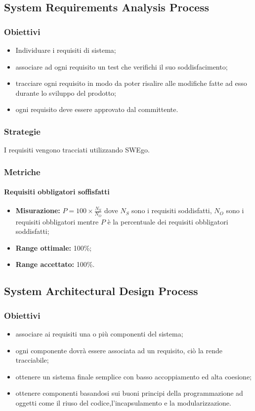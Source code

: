 	\subsection{System Requirements Analysis Process}
\subsubsection{Obiettivi}
\begin{itemize}
	\item Individuare i requisiti di sistema;
	\item associare ad ogni requisito un test che verifichi il suo soddisfacimento; 
	\item tracciare ogni requisito in modo da poter risalire alle modifiche fatte ad esso durante lo sviluppo del prodotto;
	\item ogni requisito deve essere approvato dal committente.
\end{itemize}
\subsubsection{Strategie}
I requisiti vengono tracciati utilizzando SWEgo.
\subsubsection{Metriche}
\paragraph{Requisiti obbligatori soffisfatti}
\begin{itemize}
	\item \textbf{Misurazione:} $P=100\times\frac{N_S}{N_O}$ dove $N_S$ sono i requisiti soddisfatti, $N_O$ sono i requisiti obbligatori mentre $P$ è la percentuale dei requisiti obbligatori soddisfatti;
	\item \textbf{Range ottimale:} 100\%;
	\item \textbf{Range accettato:} 100\%.
\end{itemize}

	\subsection{System Architectural Design Process}
		\subsubsection{Obiettivi}
		\begin{itemize}
			\item associare ai requisiti una o più componenti del sistema;
			\item ogni componente dovrà essere associata ad un requisito, ciò la rende tracciabile;
			\item ottenere un sistema finale semplice con basso accoppiamento ed alta coesione;
			\item ottenere componenti basandosi sui buoni principi della programmazione ad oggetti come il riuso del codice,l'incapsulamento e la modularizzazione.
		\end{itemize}
